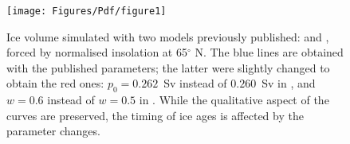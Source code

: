 \begin{figure}
\begin{center}
\texttt{[image: Figures/Pdf/figure1]}
\end{center}
\caption
{
 Ice volume simulated with two models previously published: \cite{saltzman90sm}  and \cite{tziperman06pacing}, forced by normalised insolation at 65$^\circ$ N. The blue lines are obtained with the published parameters; the latter were slightly changed to obtain the red ones: $p_0=0.262$~Sv instead of $0.260$~Sv in \cite{tziperman06pacing}, and $w=0.6$ instead of $w=0.5$ in \cite{saltzman90sm}. While the qualitative aspect of the curves are preserved, the timing of ice ages is affected by the parameter changes.  
}
\label{fig:figure1}
\end{figure}
